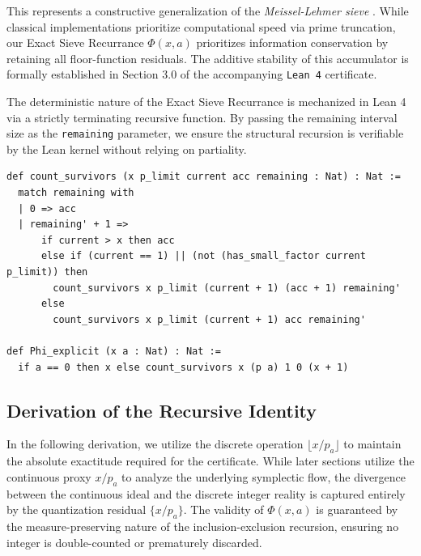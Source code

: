 \documentclass[sn-mathphys-num, pdflatex, referee]{sn-jnl}
\begin{document}
This represents a constructive generalization of the \textit{Meissel-Lehmer sieve} \cite{Lehmer1959, Crandall2005}. While classical implementations prioritize computational speed via prime truncation, our Exact Sieve Recurrance $\Phi(x,a)$ prioritizes information conservation by retaining all floor-function residuals. The additive stability of this accumulator is formally established in Section 3.0 of the accompanying \texttt{Lean 4} certificate.

The deterministic nature of the Exact Sieve Recurrance is mechanized in Lean 4 via a strictly terminating recursive function. By passing the remaining interval size as the \texttt{remaining} parameter, we ensure the structural recursion is verifiable by the Lean kernel without relying on partiality.

\begin{lstlisting}[caption={The Deterministic Exact Sieve Recurrence}, label={lst:count_survivors}]
def count_survivors (x p_limit current acc remaining : Nat) : Nat :=
  match remaining with
  | 0 => acc
  | remaining' + 1 =>
      if current > x then acc
      else if (current == 1) || (not (has_small_factor current p_limit)) then
        count_survivors x p_limit (current + 1) (acc + 1) remaining'
      else
        count_survivors x p_limit (current + 1) acc remaining'

def Phi_explicit (x a : Nat) : Nat :=
  if a == 0 then x else count_survivors x (p a) 1 0 (x + 1)
\end{lstlisting}

\subsection{Derivation of the Recursive Identity}
In the following derivation, we utilize the discrete operation $\lfloor x/p_a \rfloor$ to maintain the absolute exactitude required for the certificate. While later sections utilize the continuous proxy $x/p_a$ to analyze the underlying symplectic flow, the divergence between the continuous ideal and the discrete integer reality is captured entirely by the quantization residual $\{x/p_a\}$. The validity of  $\Phi(x,a)$ is guaranteed by the measure-preserving nature of the inclusion-exclusion recursion, ensuring no integer is double-counted or prematurely discarded.
\end{document}
